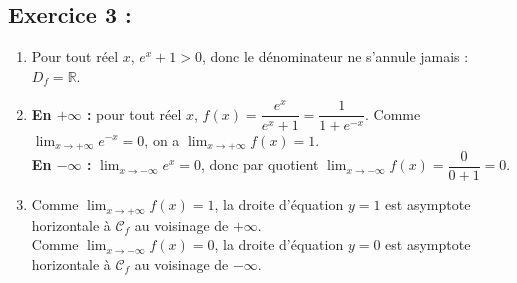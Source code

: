 \documentclass[12pt,a4paper]{article}
\begin{document}
\subsection*{Exercice 3 :}
\begin{enumerate}
\item Pour tout réel $x$, $e^x+1>0$, donc le dénominateur ne s'annule jamais : $D_f=\mathbb{R}$.

\item \textbf{En $+\infty$ :} pour tout réel $x$, $f(x)=\dfrac{e^x}{e^x+1}=\dfrac{1}{1+e^{-x}}$. Comme $\displaystyle\lim_{x\to+\infty}e^{-x}=0$, on a $\displaystyle\lim_{x\to+\infty}f(x)=1$.\\
\textbf{En $-\infty$ :} $\displaystyle\lim_{x\to-\infty}e^x=0$, donc par quotient $\displaystyle\lim_{x\to-\infty}f(x)=\dfrac{0}{0+1}=0$.

\item Comme $\displaystyle\lim_{x\to+\infty}f(x)=1$, la droite d'équation $y=1$ est asymptote horizontale à $\mathscr{C}_f$ au voisinage de $+\infty$.\\
Comme $\displaystyle\lim_{x\to-\infty}f(x)=0$, la droite d'équation $y=0$ est asymptote horizontale à $\mathscr{C}_f$ au voisinage de $-\infty$.
\end{enumerate}
\end{document}
